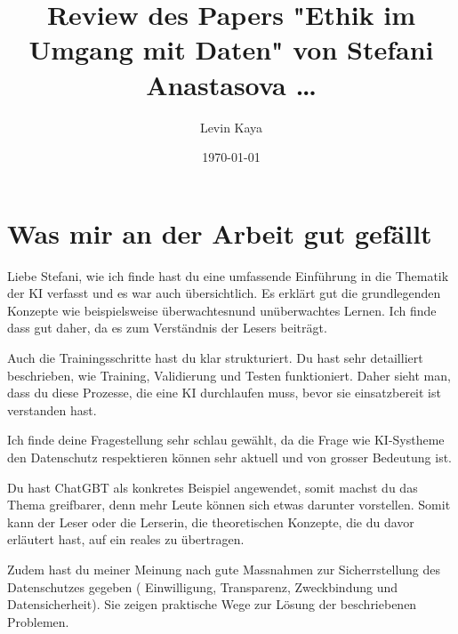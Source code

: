 \documentclass{article}
\title{Review des Papers "Ethik im Umgang mit Daten" von Stefani Anastasova \dots}
\author{Levin Kaya}
\date{\today}
\begin{document}
\maketitle




\section{Was mir an der Arbeit gut gefällt}
Liebe Stefani, wie ich finde hast du eine umfassende Einführung in die Thematik der KI verfasst und es war auch übersichtlich. Es erklärt gut die grundlegenden Konzepte wie beispielsweise überwachtesnund unüberwachtes Lernen. Ich finde dass gut daher, da es zum Verständnis der Lesers beiträgt.

Auch die Trainingsschritte hast du klar strukturiert. Du hast sehr detailliert beschrieben, wie Training, Validierung und Testen funktioniert. Daher sieht man, dass du diese Prozesse, die eine KI durchlaufen muss, bevor sie einsatzbereit ist verstanden hast.

Ich finde deine Fragestellung sehr schlau gewählt, da die Frage wie KI-Systheme den Datenschutz respektieren können sehr aktuell und von grosser Bedeutung ist.

Du hast ChatGBT als konkretes Beispiel angewendet, somit machst du das Thema greifbarer, denn mehr Leute können sich etwas darunter vorstellen. Somit kann der Leser oder die Lerserin, die theoretischen Konzepte, die du davor erläutert hast, auf ein reales zu übertragen.


Zudem hast du meiner Meinung nach gute Massnahmen zur Sicherrstellung des Datenschutzes gegeben ( Einwilligung, Transparenz, Zweckbindung und Datensicherheit). Sie zeigen praktische Wege zur Lösung der beschriebenen Problemen.

\printbibliography
\end{document}
